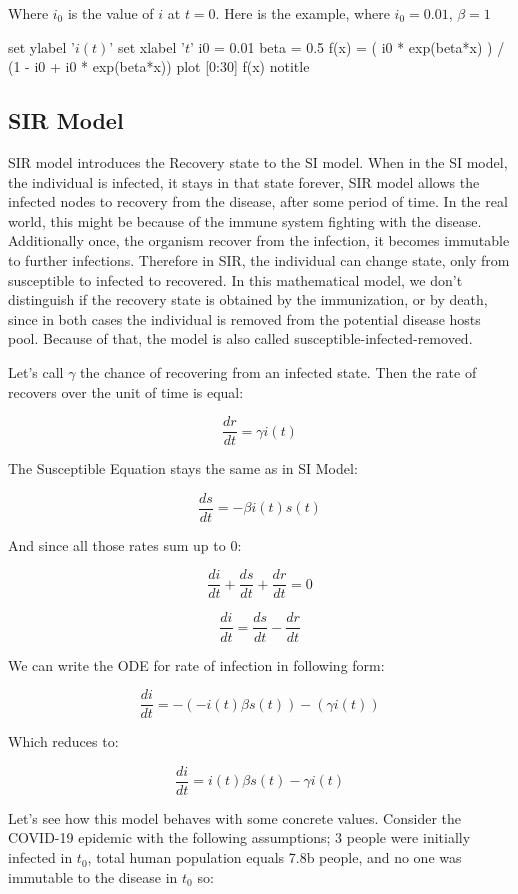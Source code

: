 \documentclass[nostrict]{szablonPG}
\begin{document}
Where $i_0$ is the value of $i$ at $t = 0$. Here is the example, where $i_0 = 0.01$, $\beta = 1$


\begin{gnuplot}[scale=0.8]
	set ylabel '$i(t)$'
	set xlabel '$t$'
	i0 = 0.01
	beta = 0.5
	f(x) = ( i0 * exp(beta*x) ) / (1 - i0 + i0 * exp(beta*x))
	plot [0:30] f(x) notitle
\end{gnuplot}

\subsection{SIR Model}

SIR model introduces the Recovery state to the SI model. When in the SI model, the individual is infected, it stays in that state forever, SIR model allows the infected nodes to recovery from the disease, after some period of time. In the real world, this might be because of the immune system fighting with the disease. Additionally once, the organism recover from the infection, it becomes immutable to further infections. Therefore in SIR, the individual can change state, only from susceptible to infected to recovered. In this mathematical model, we don't distinguish if the recovery state is obtained by the immunization, or by death, since in both cases the individual is removed from the potential disease hosts pool. Because of that, the model is also called susceptible-infected-removed.

Let's call $\gamma$ the chance of recovering from an infected state. Then the rate of recovers over the unit of time is equal:

\[\frac{dr}{dt} = \gamma i(t)\]

The Susceptible Equation stays the same as in SI Model:

\[\frac{ds}{dt} = -\beta i(t) s(t)\]

And since all those rates sum up to 0:

\[\frac{di}{dt} + \frac{ds}{dt} + \frac{dr}{dt} = 0\]

\[\frac{di}{dt} = \frac{ds}{dt} - \frac{dr}{dt}\]

We can write the ODE for rate of infection in following form:

\[\frac{di}{dt} = -(- i(t) \beta s(t)) - (\gamma i(t))\]

Which reduces to:

\[\frac{di}{dt} = i(t) \beta s(t) - \gamma i(t)\]


Let's see how this model behaves with some concrete values.  Consider the COVID-19 epidemic with the following assumptions; 3 people were initially infected in $t_0$, total human population equals 7.8b people, and no one was immutable to the disease in $t_0$ so:
\end{document}
